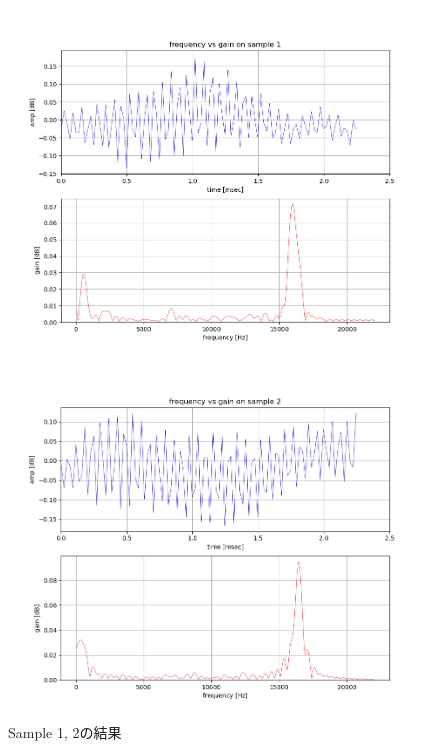 \documentclass[dvipdfmx,titlepage,a4j]{jsarticle}  %
\begin{document}
\begin{figure}[H]
  \begin{minipage}[b]{0.45\linewidth}
    \centering
    \includegraphics[scale=0.3]{../picture/1.png}
  \end{minipage}
  \begin{minipage}[b]{0.45\linewidth}
    \centering
    \includegraphics[scale=0.3]{../picture/2.png}
  \end{minipage}
  \caption{Sample 1, 2の結果}
  \label{fig:sample1}
\end{figure}
\end{document}
